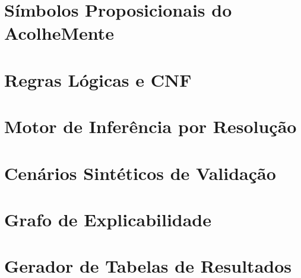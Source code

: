 \documentclass[
    12pt,
    openright,
    oneside,
    a4paper,
    english,
    brazil
]{abntex2}
\begin{document}
\begin{apendicesenv}
\partapendices

\chapter{Símbolos Proposicionais do AcolheMente}
\label{ap:simbolos}


\chapter{Regras Lógicas e CNF}
\label{ap:regras}


\chapter{Motor de Inferência por Resolução}
\label{ap:motor}


\chapter{Cenários Sintéticos de Validação}
\label{ap:cenarios}


\chapter{Grafo de Explicabilidade}
\label{ap:grafo}


\chapter{Gerador de Tabelas de Resultados}
\label{ap:tabelas}


\end{apendicesenv}
\end{document}
